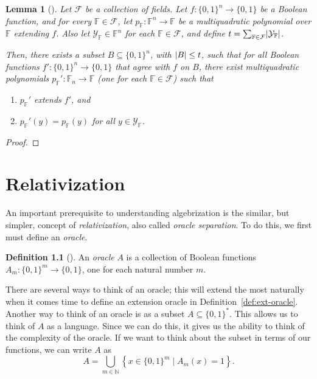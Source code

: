 \documentclass{reedthesis}
\theoremstyle{plain}
\newtheorem{lemma}[thm]{Lemma}
\theoremstyle{definition}
\newtheorem{defn}[thm]{Definition}
\theoremstyle{remark}
\DeclarePairedDelimiter{\abs}{\lvert}{\rvert}
\numberwithin{equation}{section}
\begin{document}
\begin{lemma}[{\cite[Lemma 4.5]{AW09}}]\label{lem:multiquad-adversary}
  Let $\mathcal{F}$ be a collection of fields. Let $f: \{0, 1\}^{n} \rightarrow \{0, 1\}$ be a
  Boolean function, and for every $\mathbb{F} \in \mathcal{F}$, let
  $p_{\mathbb{F}}: \mathbb{F}^{n} \rightarrow \mathbb{F}$ be a multiquadratic polynomial
  over $\mathbb{F}$ extending $f$. Also let $\mathcal{Y}_{\mathbb{F}} \in \mathbb{F}^{n}$
  for each $\mathbb{F} \in \mathcal{F}$, and define
  $t = \sum_{\mathbb{F} \in \mathcal{F}}\abs{\mathcal{Y}_{\mathbb{F}}}$.

  Then, there exists a subset $B \subseteq \{0, 1\}^{n}$, with $\abs{B} \le t$, such that
  for all Boolean functions $f': \{0, 1\}^{n} \rightarrow \{0, 1\}$ that agree with $f$ on
  $B$, there exist multiquadratic polynomials
  $p_{\mathbb{F}}':\mathbb{F}_{n} \rightarrow \mathbb{F}$ (one for each $\mathbb{F} \in \mathcal{F}$)
  such that
  \begin{enumerate}
    \item $p_{\mathbb{F}}'$ extends $f'$, and
    \item $p_{\mathbb{F}}'(y) = p_{\mathbb{F}}(y)$ for all $y \in \mathcal{Y}_{\mathbb{F}}$.
  \end{enumerate}
\end{lemma}

\begin{proof}
\end{proof}

\chapter{Relativization}


An important prerequisite to understanding algebrization is the similar, but
simpler, concept of \emph{relativization}, also called \emph{oracle separation}.
To do this, we first must define an \emph{oracle}.
\begin{defn}[{\cite[Def.\ 2.1]{AW09}}]\label{def:oracle}
  An \emph{oracle} $A$ is a collection of Boolean functions
  $A_{m}: \{0, 1\}^{m} \rightarrow \{0, 1\}$, one for each natural number $m$.
\end{defn}
There are several ways to think of an oracle; this will extend the most
naturally when it comes time to define an extension oracle in
Definition~\ref{def:ext-oracle}. Another way to think of an oracle is as a
subset $A \subseteq \{0, 1\}^{*}$. This allows us to think of $A$ as a language. Since
we can do this, it gives us the ability to think of the complexity of the
oracle. If we want to think about the subset in terms of our functions, we can
write $A$ as
\begin{equation}
  A = \bigcup_{m \in \mathbb{N}}\left\{x \in \{0, 1\}^{m} \mid A_{m}(x) = 1\right\}.
\end{equation}
\end{document}

